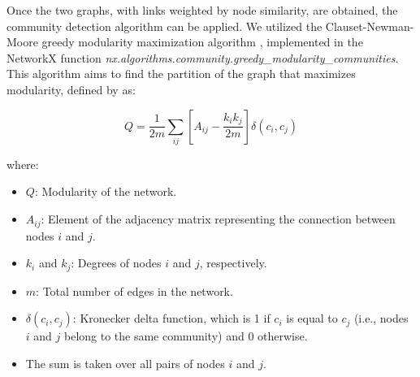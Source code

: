 Once the two graphs, with links weighted by node similarity, are obtained, the community detection algorithm
can be applied. We utilized the Clauset-Newman-Moore greedy modularity maximization algorithm \cite{Clauset_Newman_Moore_2004},
implemented in the NetworkX function \textit{nx.algorithms.community.greedy\_modularity\_communities}. This algorithm aims to
find the partition of the graph that maximizes modularity, defined by  \cite{Newman_2006} as:

\begin{equation}
    Q = \frac{1}{2m} \sum_{ij} \left[A_{ij} - \frac{k_i k_j}{2m}\right] \delta(c_i, c_j) \label{eq:modularity}
\end{equation}

where:

\begin{itemize}
    \setlength\itemsep{0.4em} %
    \item \(Q\): Modularity of the network.
    \item \(A_{ij}\): Element of the adjacency matrix representing the connection between nodes \(i\) and \(j\).
    \item \(k_i\) and \(k_j\): Degrees of nodes \(i\) and \(j\), respectively.
    \item \(m\): Total number of edges in the network.
    \item \(\delta(c_i, c_j)\): Kronecker delta function, which is 1 if \(c_i\) is equal to \(c_j\) (i.e., nodes \(i\)
          and \(j\) belong to the same community) and 0 otherwise.
    \item The sum is taken over all pairs of nodes \(i\) and \(j\).
\end{itemize}






